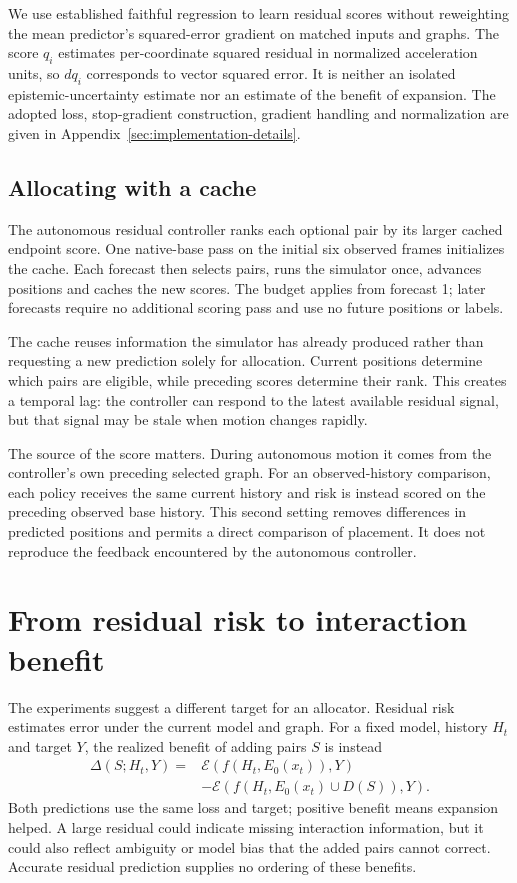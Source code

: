 We use established faithful regression\citep{stirn2023} to learn residual scores without reweighting the mean predictor's squared-error gradient on matched inputs and graphs. The score $q_i$ estimates per-coordinate squared residual in normalized acceleration units, so $dq_i$ corresponds to vector squared error. It is neither an isolated epistemic-uncertainty estimate nor an estimate of the benefit of expansion. The adopted loss, stop-gradient construction, gradient handling and normalization are given in Appendix~\ref{sec:implementation-details}.

\subsection{Allocating with a cache}
The autonomous residual controller ranks each optional pair by its larger cached endpoint score. One native-base pass on the initial six observed frames initializes the cache. Each forecast then selects pairs, runs the simulator once, advances positions and caches the new scores. The budget applies from forecast 1; later forecasts require no additional scoring pass and use no future positions or labels.

The cache reuses information the simulator has already produced rather than requesting a new prediction solely for allocation. Current positions determine which pairs are eligible, while preceding scores determine their rank. This creates a temporal lag: the controller can respond to the latest available residual signal, but that signal may be stale when motion changes rapidly.

The source of the score matters. During autonomous motion it comes from the controller's own preceding selected graph. For an observed-history comparison, each policy receives the same current history and risk is instead scored on the preceding observed base history. This second setting removes differences in predicted positions and permits a direct comparison of placement. It does not reproduce the feedback encountered by the autonomous controller.


\section{From residual risk to interaction benefit}
The experiments suggest a different target for an allocator. Residual risk estimates error under the current model and graph. For a fixed model, history $H_t$ and target $Y$, the realized benefit of adding pairs $S$ is instead
\begin{align}
 \Delta(S;H_t,Y)={}&\mathcal E(f(H_t,E_0(x_t)),Y)\nonumber\\
 &-\mathcal E(f(H_t,E_0(x_t)\cup D(S)),Y).
 \label{eq:intervention-benefit}
\end{align}
Both predictions use the same loss and target; positive benefit means expansion helped. A large residual could indicate missing interaction information, but it could also reflect ambiguity or model bias that the added pairs cannot correct. Accurate residual prediction supplies no ordering of these benefits.

